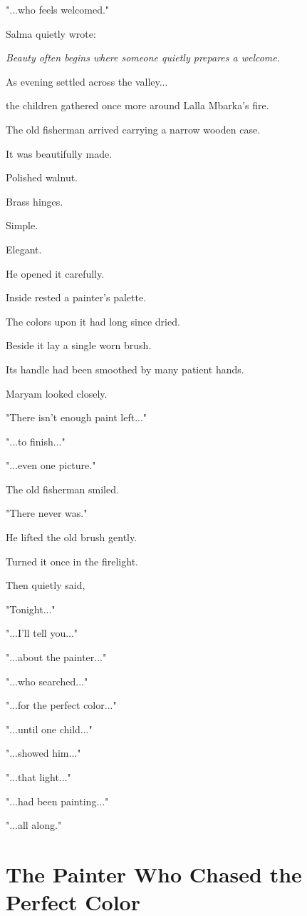 \documentclass[12pt,openany]{book}
\begin{document}
"...who feels welcomed."

Salma quietly wrote:

\emph{Beauty often begins where someone quietly prepares a welcome.}

As evening settled across the valley...

the children gathered once more around Lalla Mbarka's fire.

The old fisherman arrived carrying a narrow wooden case.

It was beautifully made.

Polished walnut.

Brass hinges.

Simple.

Elegant.

He opened it carefully.

Inside rested a painter's palette.

The colors upon it had long since dried.

Beside it lay a single worn brush.

Its handle had been smoothed by many patient hands.

Maryam looked closely.

"There isn't enough paint left..."

"...to finish..."

"...even one picture."

The old fisherman smiled.

"There never was."

He lifted the old brush gently.

Turned it once in the firelight.

Then quietly said,

"Tonight..."

"...I'll tell you..."

"...about the painter..."

"...who searched..."

"...for the perfect color..."

"...until one child..."

"...showed him..."

"...that light..."

"...had been painting..."

"...all along."
\section*{The Painter Who Chased the Perfect Color}
\end{document}
